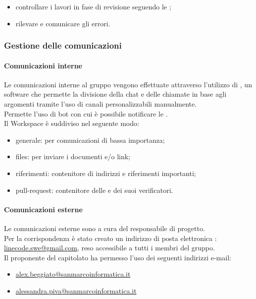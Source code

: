 		\begin{itemize}
			\item controllare i lavori in fase di revisione seguendo le ;
			\item rilevare e comunicare gli errori.
		\end{itemize}

		 \subsubsection{Gestione delle comunicazioni}

		 \paragraph{Comunicazioni interne}
		 Le comunicazioni interne al gruppo vengono effettuate attraverso l'utilizzo di , un software che permette la divisione della chat e delle chiamate in base agli argomenti tramite l'uso di canali personalizzabili manualmente. \\ Permette l'uso di bot con cui è possibile notificare le .\\
		 Il Workspace è suddiviso nel seguente modo:
		 	\begin{itemize}
		 	\item {\ttfamily generale}: per comunicazioni di bassa importanza;
		 	\item {\ttfamily files}: per inviare i documenti e/o link;
		 	\item {\ttfamily riferimenti}: contenitore di indirizzi e riferimenti importanti;
		 	\item {\ttfamily pull-request}: contenitore delle  e dei suoi verificatori.
		 	\end{itemize}

		 \paragraph{Comunicazioni esterne}
		 Le comunicazioni esterne sono a cura del responsabile di progetto. \\
		 Per la corrispondenza è stato creato un indirizzo di posta elettronica : \url{linecode.swe@gmail.com}, reso accessibile a tutti i membri del gruppo.\\
		 Il proponente del capitolato ha  permesso l'uso dei seguenti indirizzi e-mail:
		 \begin{itemize}
		 	\item \url{alex.beggiato@sanmarcoinformatica.it}
		 	\item \url{alessandra.piva@sanmarcoinformatica.it}
		 \end{itemize}

